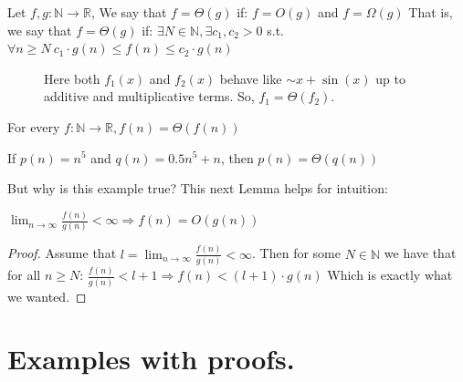 \begin{definition}
Let \( f, g : \mathbb{N} \rightarrow \mathbb{R} \), We say that \(f = \Theta(g)\) if:
\(f = O(g)\) and \(f = \Omega(g)\)
That is, we say that \(f = \Theta(g)\) if:
\( \exists N \in \mathbb{N}, \exists c_1, c_2 > 0\) s.t. \(\forall n \ge N \ c_1\cdot g(n) \le f(n) \le c_2 \cdot g(n)\)
\end{definition}


\begin{figure}[h]
  \label{fig:bigTheta}
\caption{Here both $f_{1}(x)$ and $f_{2}(x)$ behave like $\sim  x+ \sin(x)$ up to additive and multiplicative terms. So, $f_{1} = \Theta(f_{2})$.} 
\end{figure}



\begin{example} For every \(f : \mathbb{N} \rightarrow \mathbb{R}, f(n) = \Theta(f(n))\) \end{example}
\begin{example} If \(p(n) = n^5\) and \(q(n) = 0.5n^5 + n\), then \(p(n) = \Theta(q(n))\)\end{example}
But why is this example true? This next Lemma helps for intuition:
\begin{lemma}
  \( \lim_{n \rightarrow \infty} \frac{f(n)}{g(n)} < \infty \Rightarrow f(n) = O(g(n)) \)
\end{lemma}

\begin{proof} Assume that \(l = \lim_{n \rightarrow \infty} \frac{f(n)}{g(n)} < \infty\). Then for some \(N \in \mathbb{N}\) we have that for all \(n \ge N\):
\( \frac{f(n)}{g(n)} < l + 1 \Rightarrow f(n) < (l + 1) · g(n) \)
Which is exactly what we wanted.
\end{proof}
\section{Examples with proofs.}

